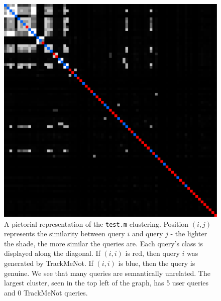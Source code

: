 \documentclass[11pt]{article}
\begin{document}
\begin{multicols}{2}
  \begin{figure}[h]
    \centering
    \includegraphics[width=\linewidth]{test}
    \caption{A pictorial representation of the \texttt{test.m}
      clustering. Position $(i,j)$ represents the similarity between
      query $i$ and query $j$ - the lighter the shade, the more
      similar the queries are. Each query's class is displayed along
      the diagonal. If $(i,i)$ is red, then query $i$ was generated by
      TrackMeNot. If $(i,i)$ is blue, then the query is genuine. We
      see that many queries are semantically unrelated. The largest
      cluster, seen in the top left of the graph, has 5 user queries and 0
      TrackMeNot queries.}
    \label{fig:disco.test}
  \end{figure}



\end{multicols}
\end{document}
